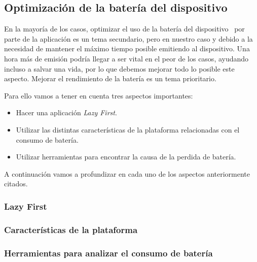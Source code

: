 \subsection{Optimización de la batería del dispositivo}

En la mayoría de los casos, optimizar el uso de la batería del 
dispositivo~\cite{OPTIMIZABATERIA} por parte de la aplicación 
es un tema secundario, pero en nuestro caso y debido a la
 necesidad de mantener el máximo tiempo posible emitiendo al dispositivo.
 Una hora más de emisión podría llegar a ser vital en el peor de los casos, 
ayudando incluso a salvar una vida, por lo que debemos mejorar todo lo
 posible este aspecto. Mejorar el rendimiento de la batería es un tema prioritario.


Para ello vamos a tener en cuenta tres aspectos importantes:
\begin{itemize}
\item Hacer una aplicación \textit{Lazy First}.
\item Utilizar las distintas características de la plataforma relacionadas
 con el consumo de batería.
\item Utilizar herramientas para encontrar la causa de la perdida de batería.
\end{itemize}

A continuación vamos a profundizar en cada uno de los aspectos 
anteriormente citados.
\subsubsection{Lazy First}

\subsubsection{Características de la plataforma}

\subsubsection{Herramientas para analizar el consumo de batería}


